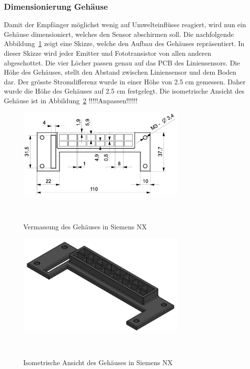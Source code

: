 \documentclass[main.tex]{subfiles} %
\begin{document}

\subsubsection{Dimensionierung Gehäuse}
Damit der Empfänger möglichst wenig auf Umwelteinflüsse reagiert, wird nun ein 
Gehäuse dimensioniert, welches den Sensor abschirmen soll. Die nachfolgende 
Abbildung~\ref{fig:Gehaeuse_Vermasst} zeigt eine Skizze, welche den Aufbau des Gehäuses repräsentiert.
In dieser Skizze wird jeder Emitter und Fototransistor von allen anderen abgeschottet. Die vier Löcher
passen genau auf das PCB des Liniensensors. Die Höhe des Gehäuses, stellt den Abstand zwischen Liniensensor
und dem Boden dar. Der grösste Stromdifferenz wurde in einer Höhe von 2.5 cm gemessen. Daher wurde die Höhe
des Gehäuses auf 2.5 cm festgelegt.
Die isometrische Ansicht des Gehäuse ist in Abbildung~\ref{fig:Gehaeuse_Isometrisch} !!!!!Anpassen!!!!!!



\begin{figure}[H]
    \centering
    \includegraphics[width=0.75\textwidth]{fig_Strecke_Tracken/Gehaeuse_Vermasst.pdf}
    \caption{Vermassung des Gehäuses in Siemens NX}~\label{fig:Gehaeuse_Vermasst}
\end{figure}

\begin{figure}[H]
    \centering
    \includegraphics[width=0.75\textwidth]{fig_Strecke_Tracken/Gehaeuse_Isometrisch.pdf}
    \caption{Isometrische Ansicht des Gehäuses in Siemens NX}~\label{fig:Gehaeuse_Isometrisch}
\end{figure}
\end{document}
